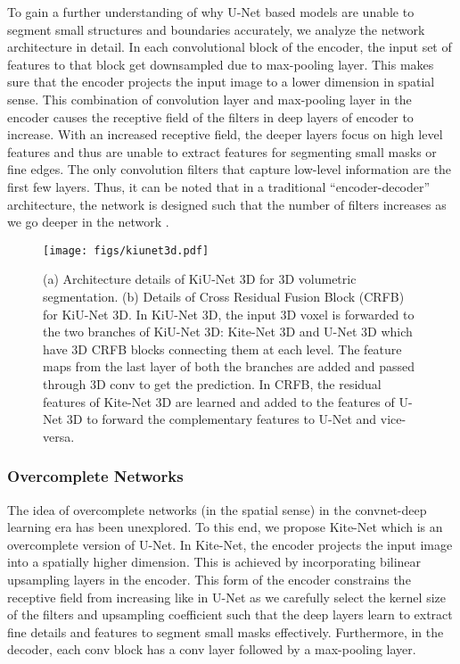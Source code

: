 \documentclass[journal,twoside,web]{ieeecolor}
\begin{document}
To gain a further understanding of why U-Net based models are unable to segment small structures and boundaries accurately, we analyze the network architecture in detail.   In each convolutional block of the encoder, the input set of features to that block get downsampled due to max-pooling layer. This makes sure that the encoder projects the input image to a lower dimension in spatial sense. This combination of convolution layer and max-pooling layer in the encoder causes the receptive field of the filters in deep layers of encoder to increase. With an increased receptive field, the deeper layers focus on high level features and thus are unable to extract features for segmenting small masks or fine edges. The only convolution filters that capture low-level information are the first few  layers. Thus, it can be noted that in a traditional ``encoder-decoder'' architecture, the network is designed such that the number of filters increases as we go deeper in the network \cite{jose2020kiu}.



\begin{figure*}[htbp]
	\centering
	\texttt{[image: figs/kiunet3d.pdf]}\\
	\caption{(a) Architecture details of KiU-Net 3D for 3D volumetric segmentation. (b) Details of Cross Residual Fusion Block (CRFB) for KiU-Net 3D. In KiU-Net 3D, the input 3D voxel is forwarded to the two branches of KiU-Net 3D: Kite-Net 3D and U-Net 3D which have 3D CRFB blocks connecting them at each level. The feature maps from the last layer of both the branches are added and passed through  3D conv to get the prediction. In CRFB, the residual features of Kite-Net 3D are learned and added to the features of U-Net 3D to forward the complementary features to U-Net and vice-versa.}
	\label{arch2}
\end{figure*}




\subsubsection{Overcomplete Networks}




The idea of overcomplete networks (in the spatial sense) in the convnet-deep learning era has been unexplored. To this end, we propose Kite-Net which is an overcomplete version of U-Net. In Kite-Net, the encoder   projects the input image into a spatially higher dimension. This is achieved by incorporating  bilinear upsampling layers in the encoder. This form of the encoder  constrains the receptive field from increasing like in U-Net as we carefully select the kernel size of the filters and upsampling coefficient such that the deep layers learn to extract fine details and features to segment small masks effectively. Furthermore, in the decoder, each conv block has a conv layer followed by a max-pooling layer. 
\end{document}

